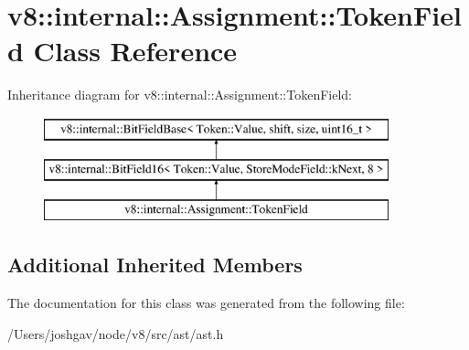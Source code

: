 \hypertarget{classv8_1_1internal_1_1_assignment_1_1_token_field}{}\section{v8\+:\+:internal\+:\+:Assignment\+:\+:Token\+Field Class Reference}
\label{classv8_1_1internal_1_1_assignment_1_1_token_field}
Inheritance diagram for v8\+:\+:internal\+:\+:Assignment\+:\+:Token\+Field\+:\begin{figure}[H]
\begin{center}
\leavevmode
\includegraphics[height=3.000000cm]{classv8_1_1internal_1_1_assignment_1_1_token_field}
\end{center}
\end{figure}
\subsection*{Additional Inherited Members}


The documentation for this class was generated from the following file\+:\begin{DoxyCompactItemize}
\item 
/\+Users/joshgav/node/v8/src/ast/ast.\+h\end{DoxyCompactItemize}
